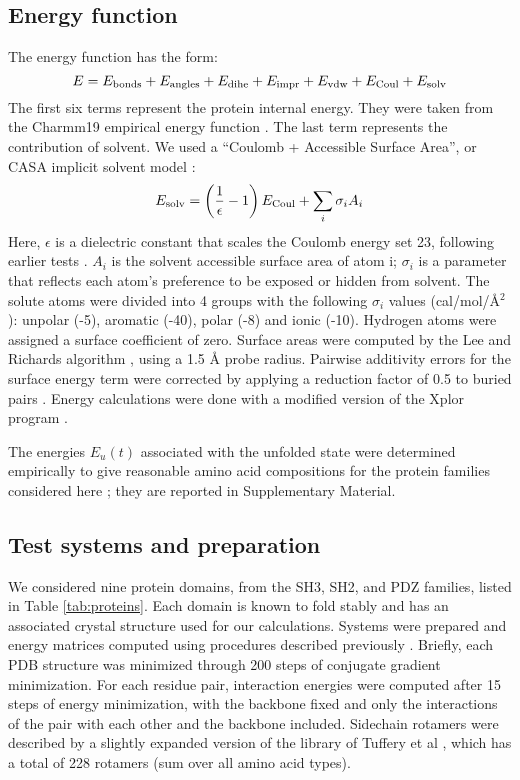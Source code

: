 \documentclass[a4paper,12pt]{article}
\begin{document}
\subsection{Energy function}
The energy function has the form:
\begin{equation} \label{eq:energy}
E = E_{\rm bonds} + E_{\rm angles} + E_{\rm dihe} + E_{\rm impr} + E_{\rm vdw} + E_{\rm Coul} + E_{\rm solv} 
\end{equation}
The first six terms represent the protein internal energy. They were taken from the Charmm19 empirical energy
function \cite{Charmm}. The last term represents the contribution of solvent. We used a ``Coulomb + Accessible
Surface Area'', or CASA implicit solvent model \cite{Lopes07,Schmidt08b}:
\begin{equation} \label{eq:casa}
E_{\rm solv} = \left( \frac{1}{\epsilon} -1 \right) E_{\rm Coul} + \sum_i \sigma_i A_i
\end{equation}
Here, $\epsilon$ is a dielectric constant that scales the Coulomb energy set 23, following earlier tests
\cite{Schmidt08b}. $A_i$ is the solvent accessible surface area of atom i; $\sigma_i$ is a parameter that reflects
each atom's preference to be exposed or hidden from solvent. The solute atoms were divided into 4 groups with
the following $\sigma_i$ values (cal/mol/\AA$^2$): unpolar (-5), aromatic (-40), polar (-8) and ionic (-10).
Hydrogen atoms were assigned a surface coefficient of zero. Surface areas were computed by the Lee and Richards
algorithm \cite{Lee71}, using a 1.5 {\AA} probe radius. Pairwise additivity errors for the surface energy term
were corrected by applying a reduction factor of 0.5 to buried pairs \cite{Street98,Lopes07}. Energy calculations
were done with a modified version of the Xplor program \cite{Xplor,Simonson13b}.

The energies $E_u(t)$ associated with the unfolded state were determined empirically to give reasonable amino
acid compositions for the protein families considered here \cite{Schmidt08}; they are reported in Supplementary
Material.

\subsection{Test systems and preparation}
We considered nine protein domains, from the SH3, SH2, and PDZ families, listed in Table \ref{tab:proteins}.
Each domain is known to fold stably and has an associated crystal structure used for our calculations. Systems
were prepared and energy matrices computed using procedures described previously \cite{Schmidt09,Schmidt10}.
Briefly, each PDB structure was minimized through 200 steps of conjugate gradient minimization. For each residue
pair, interaction energies were computed after 15 steps of energy minimization, with the backbone fixed and
only the interactions of the pair with each other and the backbone included. Sidechain rotamers were described
by a slightly expanded version of the library of Tuffery et al \cite{Tuffery91}, which has a total of 228 rotamers
(sum over all amino acid types).
\end{document}
